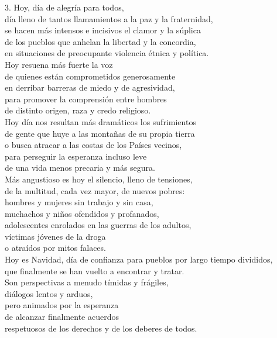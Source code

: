 3. Hoy, día de alegría para todos,\\ día lleno de tantos llamamientos a la paz y la fraternidad,\\ se hacen más intensos e incisivos el clamor y la súplica\\ de los pueblos que anhelan la libertad y la concordia,\\ en situaciones de preocupante violencia étnica y política.\\ Hoy resuena más fuerte la voz\\ de quienes están comprometidos generosamente\\ en derribar barreras de miedo y de agresividad,\\ para promover la comprensión entre hombres\\ de distinto origen, raza y credo religioso.\\ Hoy día nos resultan más dramáticos los sufrimientos\\ de gente que huye a las montañas de su propia tierra\\ o busca atracar a las costas de los Países vecinos,\\ para perseguir la esperanza incluso leve\\ de una vida menos precaria y más segura.\\ Más angustioso es hoy el silencio, lleno de tensiones,\\ de la multitud, cada vez mayor, de nuevos pobres:\\ hombres y mujeres sin trabajo y sin casa,\\ muchachos y niños ofendidos y profanados,\\ adolescentes enrolados en las guerras de los adultos,\\ víctimas jóvenes de la droga\\ o atraídos por mitos falaces.\\ Hoy es Navidad, día de confianza para pueblos por largo tiempo divididos,\\ que finalmente se han vuelto a encontrar y tratar.\\ Son perspectivas a menudo tímidas y frágiles,\\ diálogos lentos y arduos,\\ pero animados por la esperanza\\ de alcanzar finalmente acuerdos\\ respetuosos de los derechos y de los deberes de todos.

